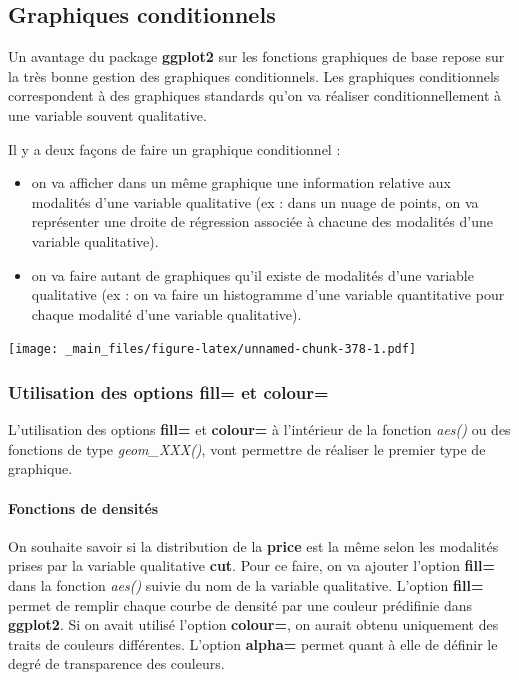 \documentclass[
]{book}
\theoremstyle{definition}
\theoremstyle{definition}
\theoremstyle{definition}
\theoremstyle{definition}
\theoremstyle{remark}
\begin{document}
\hypertarget{graphiques-conditionnels}{%
\subsection{Graphiques conditionnels}\label{graphiques-conditionnels}}

Un avantage du package \textbf{ggplot2} sur les fonctions graphiques de base repose sur la très bonne gestion des graphiques conditionnels. Les graphiques conditionnels correspondent à des graphiques standards qu'on va réaliser conditionnellement à une variable souvent qualitative.

Il y a deux façons de faire un graphique conditionnel :

\begin{itemize}
\item
  on va afficher dans un même graphique une information relative aux modalités d'une variable qualitative (ex : dans un nuage de points, on va représenter une droite de régression associée à chacune des modalités d'une variable qualitative).
\item
  on va faire autant de graphiques qu'il existe de modalités d'une variable qualitative (ex : on va faire un histogramme d'une variable quantitative pour chaque modalité d'une variable qualitative).
\end{itemize}

\texttt{[image: \_main\_files/figure-latex/unnamed-chunk-378-1.pdf]}

\hypertarget{utilisation-des-options-fill-et-colour}{%
\subsubsection{\texorpdfstring{Utilisation des options \textbf{fill=} et \textbf{colour=}}{Utilisation des options fill= et colour=}}\label{utilisation-des-options-fill-et-colour}}

L'utilisation des options \textbf{fill=} et \textbf{colour=} à l'intérieur de la fonction \emph{aes()} ou des fonctions de type \emph{geom\_XXX()}, vont permettre de réaliser le premier type de graphique.

\hypertarget{fonctions-de-densituxe9s}{%
\paragraph{Fonctions de densités}\label{fonctions-de-densituxe9s}}

On souhaite savoir si la distribution de la \textbf{price} est la même selon les modalités prises par la variable qualitative \textbf{cut}. Pour ce faire, on va ajouter l'option \textbf{fill=} dans la fonction \emph{aes()} suivie du nom de la variable qualitative. L'option \textbf{fill=} permet de remplir chaque courbe de densité par une couleur prédifinie dans \textbf{ggplot2}. Si on avait utilisé l'option \textbf{colour=}, on aurait obtenu uniquement des traits de couleurs différentes. L'option \textbf{alpha=} permet quant à elle de définir le degré de transparence des couleurs.
\end{document}
